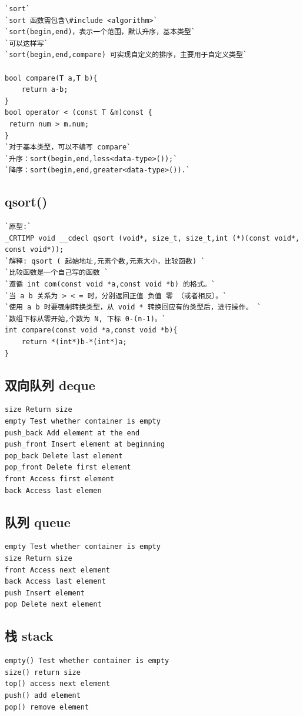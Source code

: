\documentclass[a4paper]{article}
\begin{document}
\begin{CJK*}{UTF8}{gbsn}
\begin{multicols}{3}
\begin{flushleft}
\begin{lstlisting}
`sort`
`sort 函数需包含\#include <algorithm>`
`sort(begin,end)，表示一个范围，默认升序，基本类型`
`可以这样写`
`sort(begin,end,compare) 可实现自定义的排序，主要用于自定义类型`

bool compare(T a,T b){
	return a-b;
} 
bool operator < (const T &m)const {
 return num > m.num;
}
`对于基本类型，可以不编写 compare`
`升序：sort(begin,end,less<data-type>());`
`降序：sort(begin,end,greater<data-type>()).`
\end{lstlisting}

\subsection{qsort()}
\begin{lstlisting}
`原型:`
_CRTIMP void __cdecl qsort (void*, size_t, size_t,int (*)(const void*, const void*));
`解释: qsort ( 起始地址,元素个数,元素大小，比较函数) `
`比较函数是一个自己写的函数 `
`遵循 int com(const void *a,const void *b) 的格式。`
`当 a b 关系为 > < = 时，分别返回正值 负值 零 （或者相反）。`
`使用 a b 时要强制转换类型，从 void * 转换回应有的类型后，进行操作。 `
`数组下标从零开始,个数为 N, 下标 0-(n-1)。`
int compare(const void *a,const void *b){
	return *(int*)b-*(int*)a; 
}
\end{lstlisting}

\subsection{双向队列 deque}
\begin{lstlisting}
size Return size 
empty Test whether container is empty 
push_back Add element at the end 
push_front Insert element at beginning 
pop_back Delete last element 
pop_front Delete first element 
front Access first element 
back Access last elemen
\end{lstlisting}

\subsection{队列 queue}
\begin{lstlisting}
empty Test whether container is empty
size Return size
front Access next element
back Access last element
push Insert element
pop Delete next element
\end{lstlisting}

\subsection{栈 stack}
\begin{lstlisting}
empty() Test whether container is empty 
size() return size 
top() access next element
push() add element
pop() remove element
\end{lstlisting}


\end{flushleft}
\end{multicols}
\end{CJK*}
\end{document}
